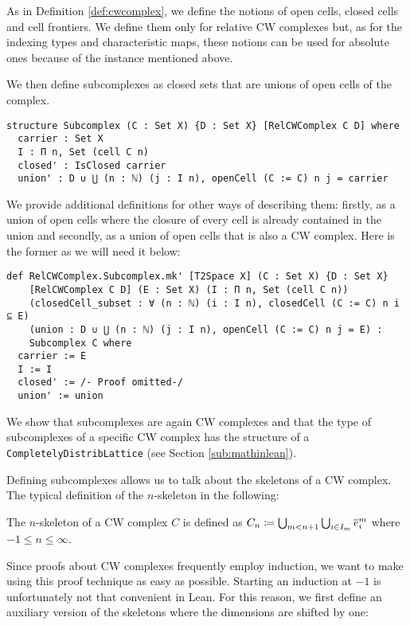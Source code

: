 As in Definition \ref{def:cwcomplex}, we define the notions of open cells, closed cells and cell frontiers.
We define them only for relative CW complexes but, as for the indexing types and characteristic maps, these notions can be used for absolute ones because of the instance mentioned above. 

We then define subcomplexes as closed sets that are unions of open cells of the complex.

\begin{lstlisting}[frame=single]
structure Subcomplex (C : Set X) {D : Set X} [RelCWComplex C D] where
  carrier : Set X
  I : Π n, Set (cell C n)
  closed' : IsClosed carrier
  union' : D ∪ ⋃ (n : ℕ) (j : I n), openCell (C := C) n j = carrier
\end{lstlisting}

We provide additional definitions for other ways of describing them: firstly, as a union of open cells where the closure of every cell is already contained in the union and secondly, as a union of open cells that is also a CW complex.
Here is the former as we will need it below:

\begin{lstlisting}[frame=single]
def RelCWComplex.Subcomplex.mk' [T2Space X] (C : Set X) {D : Set X} 
    [RelCWComplex C D] (E : Set X) (I : Π n, Set (cell C n))
    (closedCell_subset : ∀ (n : ℕ) (i : I n), closedCell (C := C) n i ⊆ E)
    (union : D ∪ ⋃ (n : ℕ) (j : I n), openCell (C := C) n j = E) : 
    Subcomplex C where
  carrier := E
  I := I
  closed' := /- Proof omitted-/
  union' := union
\end{lstlisting}

We show that subcomplexes are again CW complexes and that the type of subcomplexes of a specific CW complex has the structure of a \lstinline|CompletelyDistribLattice| (see Section  \ref{sub:mathinlean}).  

Defining subcomplexes allows us to talk about the skeletons of a CW complex. 
The typical definition of the $n$-skeleton in the following: 

\begin{defi}
  The $n$-skeleton of a CW complex $C$ is defined as $C_n \coloneq \bigcup_{m < n + 1} \bigcup_{i \in I_m} \closedCell{m}{i}$ where $-1 \le n \le \infty$.
\end{defi}

Since proofs about CW complexes frequently employ induction, we want to make using this proof technique as easy as possible. 
Starting an induction at $-1$ is unfortunately not that convenient in Lean. 
For this reason, we first define an auxiliary version of the skeletons where the dimensions are shifted by one: 

